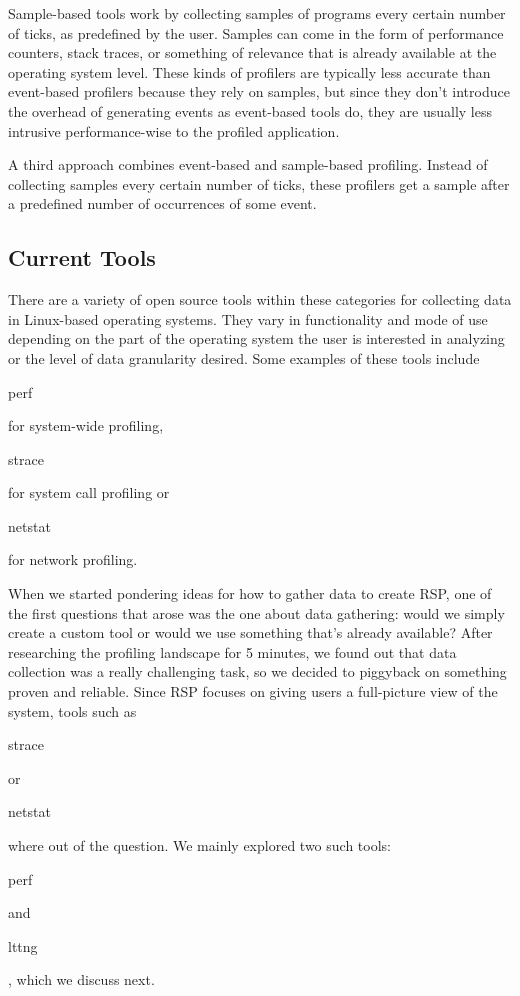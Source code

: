 \documentclass[10pt]{article}
\begin{document}
Sample-based tools work by collecting samples of programs every certain number
of ticks, as predefined by the user. Samples can come in the form of
performance counters, stack traces, or something of relevance that is already
available at the operating system level. These kinds of profilers are
typically less accurate than event-based profilers because they rely on
samples, but since they don't introduce the overhead of generating events as
event-based tools do, they are usually less intrusive performance-wise to the
profiled application.

A third approach combines event-based and sample-based profiling. Instead of
collecting samples every certain number of ticks, these profilers get a sample
after a predefined number of occurrences of some event.

\subsection{Current Tools}

There are a variety of open source tools within these categories for collecting
data in Linux-based operating systems. They vary in functionality and mode of
use depending on the part of the operating system the user is interested in
analyzing or the level of data granularity desired. Some examples of these
tools include \begin{tt}perf\end{tt} for system-wide profiling,
\begin{tt}strace\end{tt} for system call profiling or \begin{tt}netstat\end{tt}
for network profiling.

When we started pondering ideas for how to gather data to create RSP, one of
the first questions that arose was the one about data gathering: would we
simply create a custom tool or would we use something that's already available?
After researching the profiling landscape for 5 minutes, we found out that data
collection was a really challenging task, so we decided to piggyback on
something proven and reliable. Since RSP focuses on giving users a full-picture
view of the system, tools such as \begin{tt}strace\end{tt} or
\begin{tt}netstat\end{tt} where out of the question. We mainly explored two
such tools: \begin{tt}perf\end{tt} and \begin{tt}lttng\end{tt}, which we
discuss next.
\end{document}
